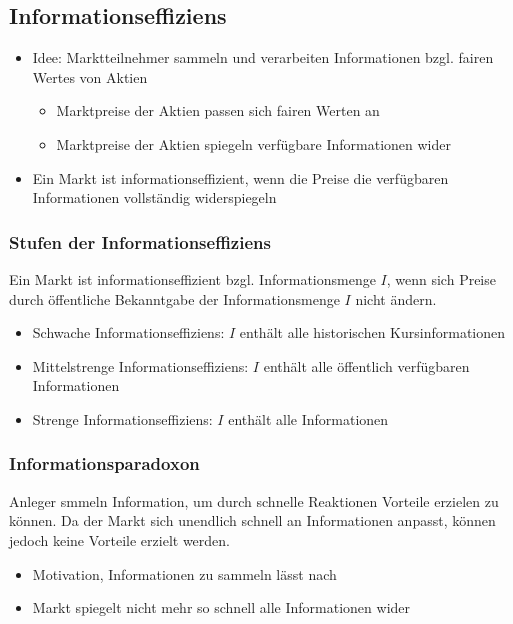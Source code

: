 \subsection{Informationseffiziens}
\begin{itemize}
	\item Idee: Marktteilnehmer sammeln und verarbeiten Informationen bzgl. fairen Wertes von Aktien
	\begin{itemize}
		\item Marktpreise der Aktien passen sich fairen Werten an
		\item Marktpreise der Aktien spiegeln verfügbare Informationen wider
	\end{itemize}
	\item Ein Markt ist informationseffizient, wenn die Preise die verfügbaren Informationen vollständig widerspiegeln
\end{itemize}

\subsubsection{Stufen der Informationseffiziens}
Ein Markt ist informationseffizient bzgl. Informationsmenge \(I\), wenn sich Preise durch öffentliche Bekanntgabe der Informationsmenge \(I\) nicht ändern.
\begin{itemize}
	\item Schwache Informationseffiziens: \(I\) enthält alle historischen Kursinformationen
	\item Mittelstrenge Informationseffiziens: \(I\) enthält alle öffentlich verfügbaren Informationen
	\item Strenge Informationseffiziens: \(I\) enthält alle Informationen
\end{itemize}

\subsubsection{Informationsparadoxon}
Anleger smmeln Information, um durch schnelle Reaktionen Vorteile erzielen zu können. Da der Markt sich unendlich schnell an Informationen anpasst, können jedoch keine Vorteile erzielt werden.
\begin{itemize}
	\item Motivation, Informationen zu sammeln lässt nach
	\item Markt spiegelt nicht mehr so schnell alle Informationen wider
\end{itemize}

